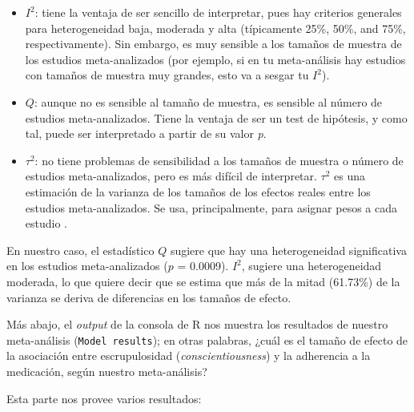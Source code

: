 \documentclass[
  bookmarksnumbered]{article}
\begin{document}
\begin{itemize}
\item
  \(I^2\): tiene la ventaja de ser sencillo de interpretar, pues hay criterios generales para heterogeneidad baja, moderada y alta (típicamente 25\%, 50\%, and 75\%, respectivamente). Sin embargo, es muy sensible a los tamaños de muestra de los estudios meta-analizados (por ejemplo, si en tu meta-análisis hay estudios con tamaños de muestra muy grandes, esto va a sesgar tu \(I^2\)).
\item
  \(Q\): aunque no es sensible al tamaño de muestra, es sensible al número de estudios meta-analizados. Tiene la ventaja de ser un test de hipótesis, y como tal, puede ser interpretado a partir de su valor \emph{p}.
\item
  \(\tau^2\): no tiene problemas de sensibilidad a los tamaños de muestra o número de estudios meta-analizados, pero es más difícil de interpretar. \(\tau^2\) es una estimación de la varianza de los tamaños de los efectos reales entre los estudios meta-analizados. Se usa, principalmente, para asignar pesos a cada estudio \autocite[para más información, ver][]{borensteinIdentifyingQuantifyingHeterogeneity2009}.
\end{itemize}

En nuestro caso, el estadístico \(Q\) sugiere que hay una heterogeneidad significativa en los estudios meta-analizados (\(p\) = 0.0009). \(I^2\), sugiere una heterogeneidad moderada, lo que quiere decir que se estima que más de la mitad (61.73\%) de la varianza se deriva de diferencias en los tamaños de efecto.

Más abajo, el \emph{output} de la consola de R nos muestra los resultados de nuestro meta-análisis (\texttt{Model\ results}); en otras palabras, ¿cuál es el tamaño de efecto de la asociación entre escrupulosidad (\emph{conscientiousness}) y la adherencia a la medicación, según nuestro meta-análisis?

Esta parte nos provee varios resultados:
\end{document}
